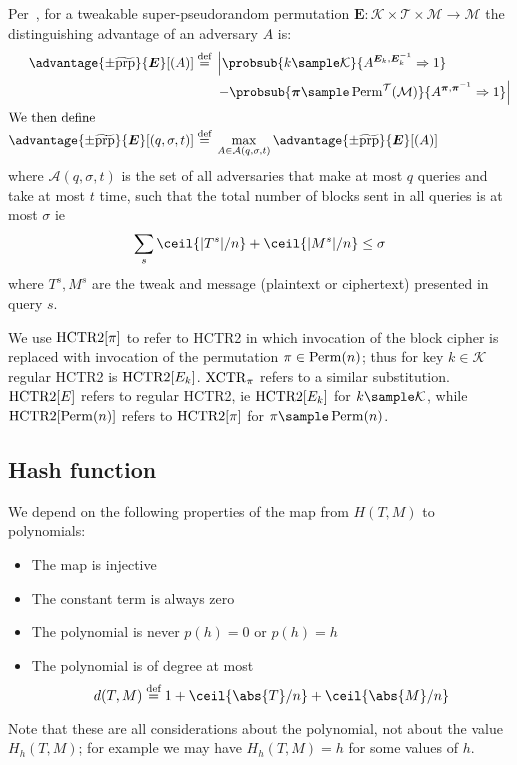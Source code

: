 \documentclass[hctr.tex]{subfiles}
\begin{document}
Per~\cite{cmc}, for a tweakable super-pseudorandom permutation
$\bm{E} : \mathcal{K} \times \mathcal{T} \times \mathcal{M} \rightarrow \mathcal{M}$
the distinguishing advantage of an adversary $A$ is:
%
\begin{align*}
    \advantage{\pm \widetilde{\mathrm{prp}}}{\bm{E}}[(A)] \defeq
    {}&\left\lvert\probsub{k \sample \mathcal{K}}{A^{\bm{E}_k,\bm{E}_k^{-1}}\Rightarrow 1}\right.
    \\
    {}&\left. - \probsub{\bm{\pi} \sample \Perm^\mathcal{T}(\mathcal{M})}
        {A^{\bm{\pi},\bm{\pi}^{-1}}\Rightarrow 1}\right\rvert
    \\
    \intertext{We then define}
    \advantage{\pm \widetilde{\mathrm{prp}}}{\bm{E}}[(q, \sigma, t)]
    \defeq {}&
    \max_{A \in \mathcal{A}(q, \sigma, t)} \advantage{\pm \widetilde{\mathrm{prp}}}{\bm{E}}[(A)]
\end{align*}
where \(\mathcal{A}(q, \sigma, t)\)
is the set of all adversaries 
that make at most \(q\) queries
and take at most \(t\) time,
such that the total number of blocks sent in all queries is
at most \(\sigma\) ie
\begin{displaymath}
    \sum_s \ceil{|T^s|/n} + \ceil{|M^s|/n} \leq \sigma
\end{displaymath}
where \(T^s, M^s\) are the tweak and message
(plaintext or ciphertext)
presented in query \(s\).

We use \(\operatorname{HCTR2}[\pi]\) to refer to HCTR2 in which invocation
of the block cipher is replaced with invocation of the
permutation \(\pi \in \operatorname{Perm}(n)\); thus for key
\(k \in \mathcal{K}\) regular HCTR2 is \(\operatorname{HCTR2}[E_k]\).
\(\operatorname{XCTR}_\pi\) refers to a similar substitution.
\(\operatorname{HCTR2}[E]\) refers to regular HCTR2,
ie \(\operatorname{HCTR2}[E_k]\) for \(k \sample \mathcal{K}\), while
\(\operatorname{HCTR2}[\operatorname{Perm}(n)]\) refers to \(\operatorname{HCTR2}[\pi]\)
for \(\pi \sample \Perm(n)\).

\subsection{Hash function}\label{hproperties}
We depend on the following properties of the map from 
\(H(T, M)\) to polynomials:
\begin{itemize}
    \item The map is injective
    \item The constant term is always zero
    \item The polynomial is never \(p(h) = 0\) or \(p(h) = h\)
    \item The polynomial is of degree at most
    \begin{displaymath}
        d(T, M) \defeq 1 + \ceil{\abs{T}/n} + \ceil{\abs{M}/n}
    \end{displaymath}
\end{itemize}
Note that these are all considerations about the polynomial,
not about the value \(H_h(T, M)\);
for example we may have \(H_h(T, M) = h\) for some values of \(h\).
\end{document}
